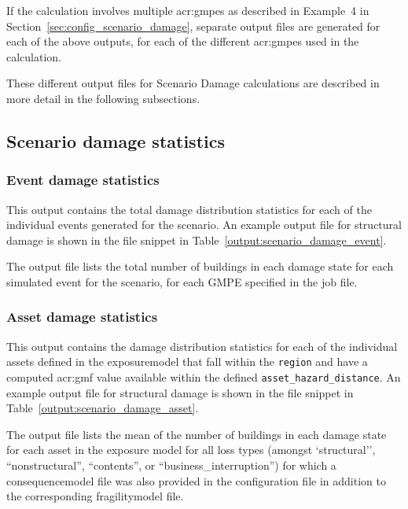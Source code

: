 If the calculation involves multiple \glspl{acr:gmpe} as described in
Example~4 in Section~\ref{sec:config_scenario_damage}, separate output files
are generated for each of the above outputs, for each of the different
\glspl{acr:gmpe} used in the calculation.

These different output files for Scenario Damage calculations are described in
more detail in the following subsections.


\subsection{Scenario damage statistics}
\label{subsec:scenario_damage_statistics}

\subsubsection{Event damage statistics}
\label{subsubsec:scenario_event_damage_statistics}

This output contains the total damage distribution statistics for each of the
individual \glspl{event} generated for the scenario. An example output file for
structural damage is shown in the file snippet in 
Table~\ref{output:scenario_damage_event}.



The output file lists the total number of buildings in each damage state 
for each simulated event for the scenario, for each GMPE specified in the
job file.


\subsubsection{Asset damage statistics}
\label{subsubsec:scenario_asset_damage_statistics}

This output contains the damage distribution statistics for each of the
individual \glspl{asset} defined in the \gls{exposuremodel} that fall within
the \Verb+region+ and have a computed \gls{acr:gmf} value available
within the defined \Verb+asset_hazard_distance+. An example output file for
structural damage is shown in the file snippet in 
Table~\ref{output:scenario_damage_asset}.



The output file lists the mean of the number
of buildings in each damage state for each asset in the exposure model
for all loss types (amongst `structural'', ``nonstructural'', ``contents'', or
``business\_interruption'') for which a \gls{consequencemodel} file was also
provided in the configuration file in addition to the corresponding
\gls{fragilitymodel} file.


